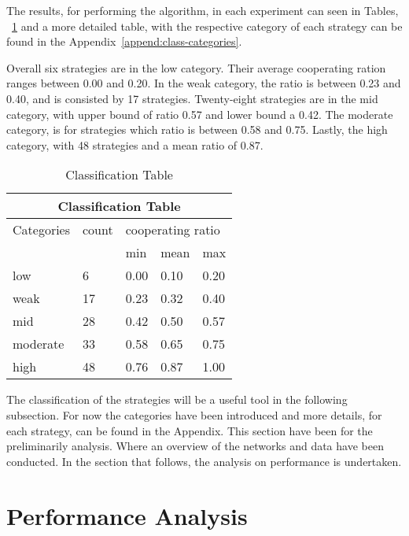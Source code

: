 The results, for performing the algorithm, in each experiment can seen in Tables,
~\ref{class} and a more detailed table, with the respective category of each
strategy can be found in the Appendix~\ref{append:class-categories}.

Overall six strategies are in the low category. Their average cooperating ration
ranges between 0.00 and 0.20. In the weak category, the ratio is between
0.23 and 0.40, and is consisted by 17 strategies. Twenty-eight strategies are
in the mid category, with upper bound of ratio 0.57 and lower bound a 0.42.
The moderate category, is for strategies which ratio is between 0.58 and 0.75.
Lastly, the high category, with 48 strategies and a mean ratio of 0.87.

\begin{table}[!hbtp]
	\centering
	\begin{adjustbox}{width=0.5\textwidth}
		\small
		\begin{tabular}{|l|l|l|l|l|}
			\hline
			\multicolumn{5}{|c|}{Classification Table}              \\ \hline
			Categories & count & \multicolumn{3}{l|}{cooperating ratio}        \\ \hline
			         &    & min  & mean & max  \\ \hline
			low      & 6  & 0.00 & 0.10 & 0.20 \\ \hline
			weak     & 17 & 0.23 & 0.32 & 0.40 \\ \hline
			mid      & 28 & 0.42 & 0.50 & 0.57 \\ \hline
			moderate & 33 & 0.58 & 0.65 & 0.75 \\ \hline
			high     & 48 & 0.76 & 0.87 & 1.00 \\ \hline
		\end{tabular}
	\end{adjustbox}
	\caption{Classification Table}
	\label{class}
\end{table}

The classification of the strategies will be a useful tool in the following
subsection. For now the categories have been introduced and more details, for
each strategy, can be found in the Appendix. This section have been for the
preliminarily analysis. Where an overview of the networks and data have been
conducted. In the section that follows, the analysis on performance is
undertaken.

\section{Performance Analysis}

